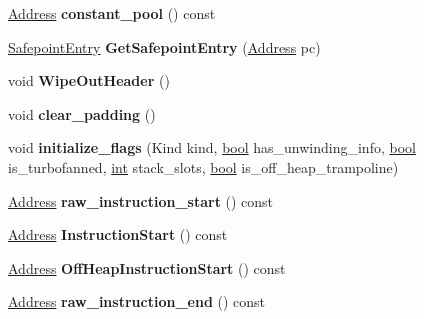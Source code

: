 \begin{DoxyCompactItemize}
\mbox{\hyperlink{classuintptr__t}{Address}} {\bfseries constant\+\_\+pool} () const
\item 
\mbox{\label{classv8_1_1internal_1_1Code_a90570278867fd86303764b8551e6d1e6}} 
\mbox{\hyperlink{classv8_1_1internal_1_1SafepointEntry}{Safepoint\+Entry}} {\bfseries Get\+Safepoint\+Entry} (\mbox{\hyperlink{classuintptr__t}{Address}} pc)
\item 
\mbox{\label{classv8_1_1internal_1_1Code_adb5e049c29724f76c81113f3f2f7ec85}} 
void {\bfseries Wipe\+Out\+Header} ()
\item 
\mbox{\label{classv8_1_1internal_1_1Code_a29cd9c722e9c7e778fc33027ea740ecb}} 
void {\bfseries clear\+\_\+padding} ()
\item 
\mbox{\label{classv8_1_1internal_1_1Code_a25ed10d3f383758e2f9606664e40436d}} 
void {\bfseries initialize\+\_\+flags} (Kind kind, \mbox{\hyperlink{classbool}{bool}} has\+\_\+unwinding\+\_\+info, \mbox{\hyperlink{classbool}{bool}} is\+\_\+turbofanned, \mbox{\hyperlink{classint}{int}} stack\+\_\+slots, \mbox{\hyperlink{classbool}{bool}} is\+\_\+off\+\_\+heap\+\_\+trampoline)
\item 
\mbox{\label{classv8_1_1internal_1_1Code_a72c5705dfc744b3001b7260489d3edfd}} 
\mbox{\hyperlink{classuintptr__t}{Address}} {\bfseries raw\+\_\+instruction\+\_\+start} () const
\item 
\mbox{\label{classv8_1_1internal_1_1Code_a8771ee589f2469b3bcca475fcf396163}} 
\mbox{\hyperlink{classuintptr__t}{Address}} {\bfseries Instruction\+Start} () const
\item 
\mbox{\label{classv8_1_1internal_1_1Code_ab7a77f9e92bc13634009280288488afd}} 
\mbox{\hyperlink{classuintptr__t}{Address}} {\bfseries Off\+Heap\+Instruction\+Start} () const
\item 
\mbox{\label{classv8_1_1internal_1_1Code_a26a551d568b162e9ff5d44e2d5897be8}} 
\mbox{\hyperlink{classuintptr__t}{Address}} {\bfseries raw\+\_\+instruction\+\_\+end} () const
\item 

\end{DoxyCompactItemize}
